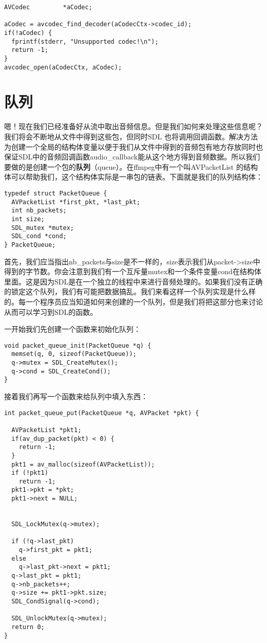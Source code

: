 \begin{lstlisting}
AVCodec         *aCodec;

aCodec = avcodec_find_decoder(aCodecCtx->codec_id);
if(!aCodec) {
  fprintf(stderr, "Unsupported codec!\n");
  return -1;
}
avcodec_open(aCodecCtx, aCodec);
\end{lstlisting}
\section{队列}

嗯！现在我们已经准备好从流中取出音频信息。但是我们如何来处理这些信息呢？我们将会不断地从文件中得到这些包，但同时SDL 也将调用回调函数。解决方法为创建一个全局的结构体变量以便于我们从文件中得到的音频包有地方存放同时也保证SDL中的音频回调函数audio_callback能从这个地方得到音频数据。所以我们要做的是创建一个包的\textbf{队列}（queue）。在ffmpeg中有一个叫AVPacketList 的结构体可以帮助我们，这个结构体实际是一串包的链表。下面就是我们的队列结构体：

\begin{lstlisting}
typedef struct PacketQueue {
  AVPacketList *first_pkt, *last_pkt;
  int nb_packets;
  int size;
  SDL_mutex *mutex;
  SDL_cond *cond;
} PacketQueue;
\end{lstlisting}

首先，我们应当指出nb_packets与size是不一样的，size表示我们从packet->size中得到的字节数。你会注意到我们有一个互斥量mutex和一个条件变量cond在结构体里面。这是因为SDL是在一个独立的线程中来进行音频处理的。如果我们没有正确的锁定这个队列，我们有可能把数据搞乱。我们来看这样一个队列实现是什么样的。每一个程序员应当知道如何来创建的一个队列，但是我们将把这部分也来讨论从而可以学习到SDL的函数。

一开始我们先创建一个函数来初始化队列：
\begin{lstlisting}
void packet_queue_init(PacketQueue *q) {
  memset(q, 0, sizeof(PacketQueue));
  q->mutex = SDL_CreateMutex();
  q->cond = SDL_CreateCond();
}
\end{lstlisting}

接着我们再写一个函数来给队列中填入东西：
\begin{lstlisting}
int packet_queue_put(PacketQueue *q, AVPacket *pkt) {

  AVPacketList *pkt1;
  if(av_dup_packet(pkt) < 0) {
    return -1;
  }
  pkt1 = av_malloc(sizeof(AVPacketList));
  if (!pkt1)
    return -1;
  pkt1->pkt = *pkt;
  pkt1->next = NULL;


  SDL_LockMutex(q->mutex);

  if (!q->last_pkt)
    q->first_pkt = pkt1;
  else
    q->last_pkt->next = pkt1;
  q->last_pkt = pkt1;
  q->nb_packets++;
  q->size += pkt1->pkt.size;
  SDL_CondSignal(q->cond);

  SDL_UnlockMutex(q->mutex);
  return 0;
}
\end{lstlisting}

